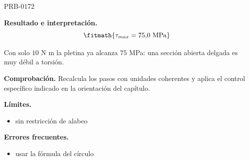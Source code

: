 \begin{studiumworked}{PRB-0172}
\begin{enumerate}
\end{enumerate}

\textbf{Resultado e interpretación.}\[\fitmath{\tau_{max} = 75{,}0\ \mathrm{MPa}}\]

Con solo $10$ N m la pletina ya alcanza $75$ MPa: una sección abierta delgada es muy débil a torsión.

\par\textbf{Comprobación.} Recalcula los pasos con unidades coherentes y aplica el control específico indicado en la orientación del capítulo.

\textbf{Límites.}\begin{itemize}\item sin restricción de alabeo\end{itemize}

\textbf{Errores frecuentes.}\begin{itemize}\item usar la fórmula del círculo\end{itemize}

\end{studiumworked}

\Needspace{.3\textheight}

